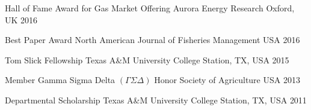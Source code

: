 
\begin{cvhonors}

  \cvhonor
    {Hall of Fame Award for Gas Market Offering} %
    {Aurora Energy Research} %
    {Oxford, UK} %
    {2016} %

  \cvhonor
    {Best Paper Award} %
    {North American Journal of Fisheries Management} %
    {USA} %
    {2016} %

  \cvhonor
    {Tom Slick Fellowship} %
    {Texas A\&M University} %
    {College Station, TX, USA} %
    {2015} %

  \cvhonor
    {Member} %
    {Gamma Sigma Delta $(\Gamma \Sigma \Delta)$ Honor Society of Agriculture} %
    {USA} %
    {2013} %

  \cvhonor
    {Departmental Scholarship} %
    {Texas A\&M University} %
    {College Station, TX, USA} %
    {2011} %

\end{cvhonors}
